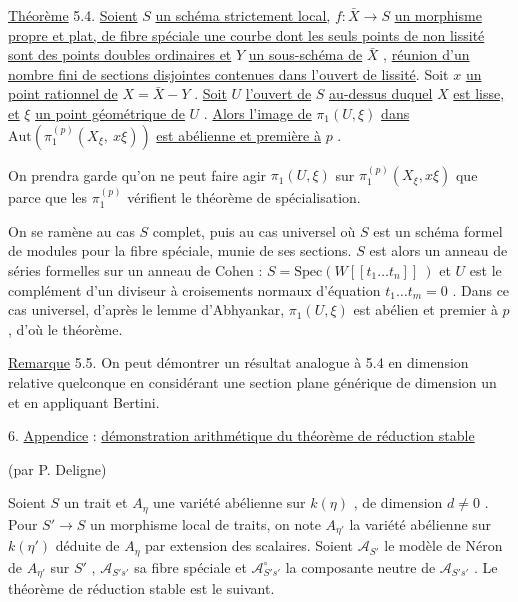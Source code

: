 
\underline{Théorème} 5.4. \underline{Soient} $S$ \underline{un schéma strictement local,} $f : \bar{X} \longrightarrow S$ \underline{un morphisme propre et plat, de fibre spéciale une courbe dont les seuls points de non lissité sont des points doubles ordinaires et} $Y$ \underline{un sous-schéma de} $\bar{X}$ , \underline{réunion d'un nombre fini de sections disjointes contenues dans l'ouvert de lissité}. Soit $x$ \underline{un point rationnel de} $X = \bar{X} - Y$ . \underline{Soit} $U$ \underline{l'ouvert de} $S$ \underline{au-dessus duquel} $X$ \underline{est lisse, et} $\xi$ \underline{un point géométrique de} $U$ . \underline{Alors l'image de} $\pi_1(U,\xi)$ \underline{dans} $\mathrm{Aut}(\pi_1^{(p)}(X_\xi,\ x\xi))$ \underline{est abélienne et première à} $p$ .

On prendra garde qu'on ne peut faire agir $\pi_1(U,\xi)$ sur $\pi_1^{(p)}(X_\xi,x\xi)$ que parce que les $\pi_1^{(p)}$ vérifient le théorème de spécialisation.

On se ramène au cas $S$ complet, puis au cas universel où $S$ est un schéma formel de modules pour la fibre spéciale, munie de ses sections. $S$ est alors un anneau de séries formelles sur un anneau de Cohen : $S = \mathrm{Spec}(W[[t_1 \ldots t_n]]\ )$ et $U$ est le complément d'un diviseur à croisements normaux d'équation $t_1 \ldots t_m = 0$ . Dans ce cas universel, d'après le lemme d'Abhyankar, $\pi_1(U,\xi)$ est abélien et premier à $p$ , d'où le théorème.

\underline{Remarque} 5.5. On peut démontrer un résultat analogue à 5.4 en dimension relative quelconque en considérant une section plane générique de dimension un et en appliquant Bertini.


6. \underline{Appendice} : \underline{démonstration arithmétique du théorème de réduction stable}

(par P. Deligne)

Soient $S$ un trait et $A_\eta$ une variété abélienne sur $k(\eta)$ , de dimension $d \neq 0$ . Pour $S' \longrightarrow S$ un morphisme local de traits, on note $A_{\eta'}$ la variété abélienne sur $k(\eta')$ déduite de $A_\eta$ par extension des scalaires. Soient $\mathcal{A}_{S'}$ le modèle de Néron de $A_{\eta'}$ sur $S'$ , $\mathcal{A}_{S's'}$ sa fibre spéciale et $\mathcal{A}^{\circ}_{S's'}$ la composante neutre de $\mathcal{A}_{S's'}$ . Le théorème de réduction stable est le suivant.


